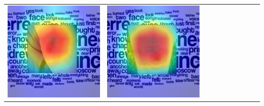 \begin{landscape}
\begin{table}[]
\begin{tabular}{@{}c c c c c c c c c c@{}}
			\includegraphics[width=.12\textheight ,keepaspectratio]{images/pretraining/gradcam/3/ENV2SCombinedGradCam.png} &
			\includegraphics[width=.12\textheight ,keepaspectratio]{images/pretraining/gradcam/9/ENV2SCombinedGradCam.png} &

\end{tabular}
\end{table}
\end{landscape}
